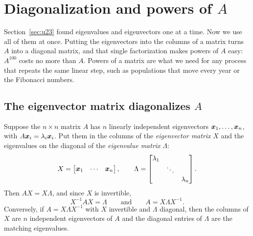 \section{Diagonalization and powers of \texorpdfstring{\(A\)}{A}}\label{sec:u24}

Section~\ref{sec:u23} found eigenvalues and eigenvectors one at a time. Now we use all of
them at once. Putting the eigenvectors into the columns of a matrix turns $A$ into a
diagonal matrix, and that single factorization makes powers of $A$ easy: $A^{100}$ costs no
more than $A$. Powers of a matrix are what we need for any process that repeats the same
linear step, such as populations that move every year or the Fibonacci numbers.

\subsection{The eigenvector matrix diagonalizes \texorpdfstring{\(A\)}{A}}

\begin{theorem}[Diagonalization]\label{thm:u24-diag}
Suppose the $n\times n$ matrix $A$ has $n$ linearly independent eigenvectors
$\boldsymbol{x}_1,\dots,\boldsymbol{x}_n$, with $A\boldsymbol{x}_i=\lambda_i\boldsymbol{x}_i$. Put them in the columns of
the \emph{eigenvector matrix} $X$ and the eigenvalues on the diagonal of the
\emph{eigenvalue matrix} $\Lambda$:
\[
  X=\begin{bmatrix} \boldsymbol{x}_1 & \cdots & \boldsymbol{x}_n\end{bmatrix},\qquad
  \Lambda=\begin{bmatrix} \lambda_1 & & \\ & \ddots & \\ & & \lambda_n\end{bmatrix}.
\]
Then $AX=X\Lambda$, and since $X$ is invertible,
\[
  X^{-1}AX=\Lambda\qquad\text{and}\qquad A=X\Lambda X^{-1}.
\]
Conversely, if $A=X\Lambda X^{-1}$ with $X$ invertible and $\Lambda$ diagonal, then the
columns of $X$ are $n$ independent eigenvectors of $A$ and the diagonal entries of $\Lambda$
are the matching eigenvalues.
\end{theorem}

